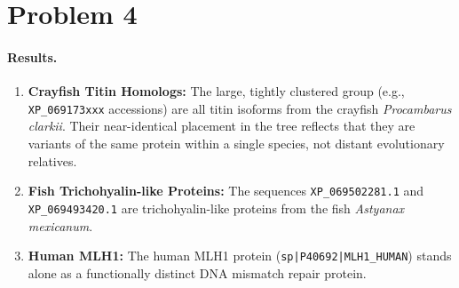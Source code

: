 \section*{Problem 4}

\paragraph{Results.} \begin{enumerate}
    \item \textbf{Crayfish Titin Homologs:} The large, tightly clustered group (e.g., \texttt{XP\_069173xxx} accessions) are all titin isoforms from the crayfish \textit{Procambarus clarkii}. Their near-identical placement in the tree reflects that they are variants of the same protein within a single species, not distant evolutionary relatives.

    \item \textbf{Fish Trichohyalin-like Proteins:} The sequences \texttt{XP\_069502281.1} and \texttt{XP\_069493420.1} are trichohyalin-like proteins from the fish \textit{Astyanax mexicanum}.

    \item \textbf{Human MLH1:} The human MLH1 protein (\texttt{sp|P40692|MLH1\_HUMAN}) stands alone as a functionally distinct DNA mismatch repair protein.
\end{enumerate}


